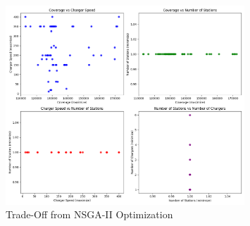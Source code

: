 \begin{figure}[h]
    \centering
    \includegraphics[width=0.8\textwidth]{../Figures/Trade_Off.png}
    \caption{Trade-Off from NSGA-II Optimization}
    \label{fig:trade-off}
\end{figure}